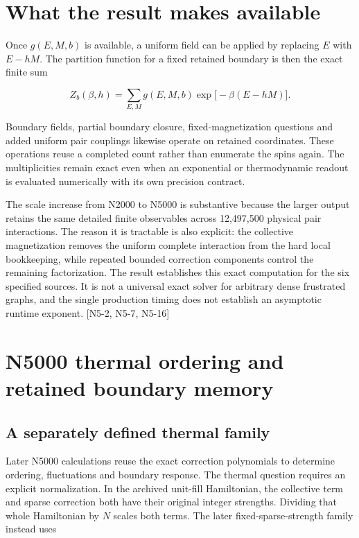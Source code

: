 \section{What the result makes available}\label{what-the-result-makes-available}

Once \(g(E,M,b)\) is available, a uniform field can be applied by replacing \(E\) with \(E-hM\). The partition function for a fixed retained boundary is then the exact finite sum

\[Z_b(\beta,h)=\sum_{E,M}g(E,M,b)\exp\!\bigl[-\beta(E-hM)\bigr].\]

Boundary fields, partial boundary closure, fixed-magnetization questions and added uniform pair couplings likewise operate on retained coordinates. These operations reuse a completed count rather than enumerate the spins again. The multiplicities remain exact even when an exponential or thermodynamic readout is evaluated numerically with its own precision contract.

The scale increase from N2000 to N5000 is substantive because the larger output retains the same detailed finite observables across 12,497,500 physical pair interactions. The reason it is tractable is also explicit: the collective magnetization removes the uniform complete interaction from the hard local bookkeeping, while repeated bounded correction components control the remaining factorization. The result establishes this exact computation for the six specified sources. It is not a universal exact solver for arbitrary dense frustrated graphs, and the single production timing does not establish an asymptotic runtime exponent. {[}N5-2, N5-7, N5-16{]}

\section{N5000 thermal ordering and retained boundary memory}\label{n5000-thermal-ordering-and-retained-boundary-memory}

\subsection{A separately defined thermal family}\label{a-separately-defined-thermal-family}

Later N5000 calculations reuse the exact correction polynomials to determine ordering, fluctuations and boundary response. The thermal question requires an explicit normalization. In the archived unit-fill Hamiltonian, the collective term and sparse correction both have their original integer strengths. Dividing that whole Hamiltonian by \(N\) scales both terms. The later fixed-sparse-strength family instead uses

